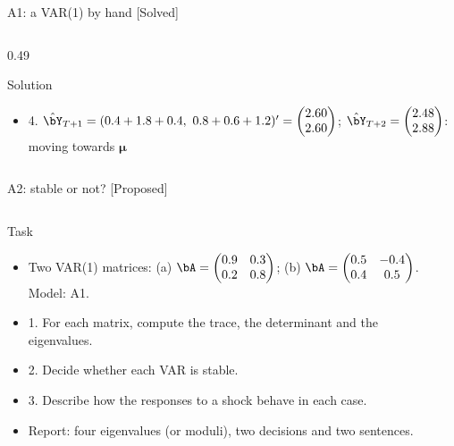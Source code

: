 \begin{frame}{A1: a VAR(1) by hand [Solved]}
\begin{columns}[T]
\begin{column}{0.49\textwidth}
\begin{exampleblock}{Solution}
\begin{itemize}
    \item 4. $\hat\bY_{T+1} = (0.4 + 1.8 + 0.4,\ 0.8 + 0.6 + 1.2)' = \begin{pmatrix} 2.60 \\ 2.60 \end{pmatrix}$; $\hat\bY_{T+2} = \begin{pmatrix} 2.48 \\ 2.88 \end{pmatrix}$: moving towards $\boldsymbol{\mu}$
\end{itemize}
\end{exampleblock}
\end{column}
\end{columns}
\end{frame}

\begin{frame}{A2: stable or not? [Proposed]}
\propsub
\itemsize{\scriptsize}
\begin{columns}[T]
\begin{column}{\taskw}
\begin{block}{Task}
\begin{itemize}
    \item Two VAR(1) matrices: (a) $\bA = \begin{pmatrix} 0.9 & 0.3 \\ 0.2 & 0.8 \end{pmatrix}$; (b) $\bA = \begin{pmatrix} 0.5 & -0.4 \\ 0.4 & 0.5 \end{pmatrix}$. Model: A1.
    \item 1. For each matrix, compute the trace, the determinant and the eigenvalues.
    \item 2. Decide whether each VAR is stable.
    \item 3. Describe how the responses to a shock behave in each case.
    \item Report: four eigenvalues (or moduli), two decisions and two sentences.
\end{itemize}
\end{block}
\end{column}
\begin{column}{\solw}
\end{column}
\end{columns}
\end{frame}

